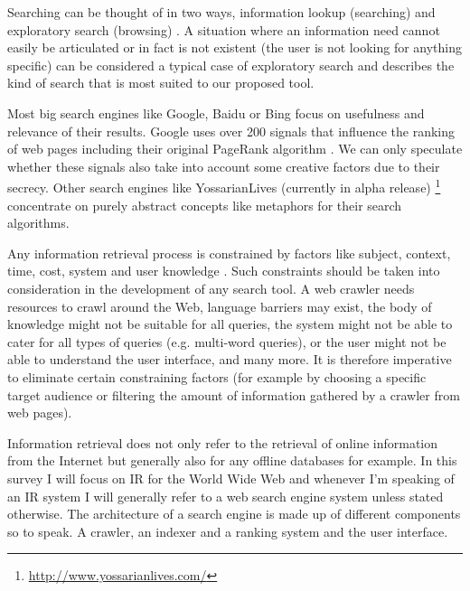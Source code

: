 Searching can be thought of in two ways, information lookup (searching) and exploratory search (browsing) \citep{DeVries1993,Marchionini2006}. A situation where an information need cannot easily be articulated or in fact is not existent (the user is not looking for anything specific) can be considered a typical case of exploratory search and describes the kind of search that is most suited to our proposed tool.

Most big search engines like Google, Baidu or Bing focus on usefulness and relevance of their results.\citep{Google2012, Baidu2012, Microsoft2012a} Google uses over 200 signals \citep{Google2012} that influence the ranking of web pages including their original PageRank algorithm \citep{Brin1998, Brin1998b}. We can only speculate whether these signals also take into account some creative factors due to their secrecy. Other search engines like YossarianLives (currently in alpha release) \footnote{\url{http://www.yossarianlives.com/}} concentrate on purely abstract concepts like metaphors for their search algorithms.

Any information retrieval process is constrained by factors like subject, context, time, cost, system and user knowledge \citep{Marchionini1988}. Such constraints should be taken into consideration in the development of any search tool. A web crawler needs resources to crawl around the Web, language barriers may exist, the body of knowledge might not be suitable for all queries, the system might not be able to cater for all types of queries (e.g. multi-word queries), or the user might not be able to understand the user interface, and many more. It is therefore imperative to eliminate certain constraining factors (for example by choosing a specific target audience or filtering the amount of information gathered by a crawler from web pages).

Information retrieval does not only refer to the retrieval of online information from the Internet but generally also for any offline databases for example. In this survey I will focus on IR for the World Wide Web and whenever I'm speaking of an IR system I will generally refer to a web search engine system unless stated otherwise. The architecture of a search engine is made up of different components so to speak. A crawler, an indexer and a ranking system and the user interface.

